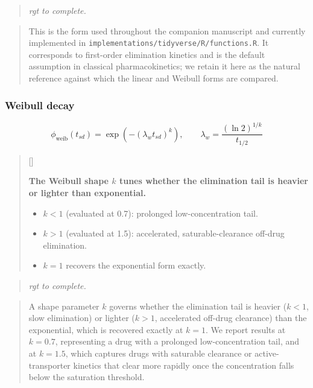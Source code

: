 \documentclass[
  11pt,
]{article}
\newcounter{pgraph}
\newenvironment{bullets}{%
  \stepcounter{pgraph}%
  \begin{quote}\small\sffamily\color[gray]{0.30}%
  {\normalfont\scriptsize\color[gray]{0.58}[\thepgraph]\enspace}}{%
  \end{quote}}
\newenvironment{rgt}{%
  \begin{quote}\small\itshape\color[RGB]{20,60,160}}{%
  \end{quote}}
\newenvironment{orig}{%
  \begin{quote}\normalsize\color[gray]{0.55}}{%
  \end{quote}}
\begin{document}
\begin{rgt}
rgt to complete.

\end{rgt}

\begin{orig}
This is the form used throughout the companion manuscript and
currently implemented in \texttt{implementations/tidyverse/R/functions.R}.
It corresponds to first-order elimination kinetics and is the
default assumption in classical pharmacokinetics; we retain it
here as the natural reference against which the linear and Weibull
forms are compared.

\end{orig}

\subsubsection{Weibull decay}\label{weibull-decay}

\[
\phi_{\text{weib}}(t_{sd}) =
  \exp\left(-\left(\lambda_w t_{sd}\right)^{k}\right), \qquad
  \lambda_w = \frac{(\ln 2)^{1/k}}{t_{1/2}}
\]

\begin{bullets}

\textbf{The Weibull shape $k$ tunes whether the elimination tail is
heavier or lighter than exponential.}

\begin{itemize}\setlength{\itemsep}{2pt}\setlength{\parskip}{0pt}
\item $k < 1$ (evaluated at 0.7): prolonged low-concentration tail.
\item $k > 1$ (evaluated at 1.5): accelerated, saturable-clearance
off-drug elimination.
\item $k = 1$ recovers the exponential form exactly.
\end{itemize}

\end{bullets}

\begin{rgt}
rgt to complete.

\end{rgt}

\begin{orig}
A shape parameter \(k\) governs whether the elimination tail is
heavier (\(k < 1\), slow elimination) or lighter (\(k > 1\),
accelerated off-drug clearance) than the exponential, which is recovered
exactly at \(k = 1\). We report results at \(k = 0.7\), representing
a drug with a prolonged low-concentration tail, and at \(k = 1.5\),
which captures drugs with saturable clearance or active-transporter
kinetics that clear more rapidly once the concentration falls below
the saturation threshold.

\end{orig}
\end{document}
